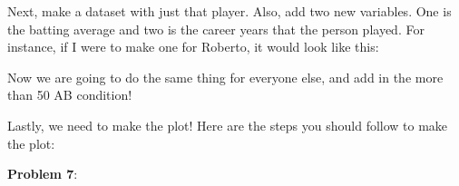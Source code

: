 \documentclass[
]{article}
\newenvironment{Shaded}{\begin{snugshade}}{\end{snugshade}}
\newcommand{\DataTypeTok}[1]{\textcolor[rgb]{0.13,0.29,0.53}{#1}}
\newcommand{\DecValTok}[1]{\textcolor[rgb]{0.00,0.00,0.81}{#1}}
\newcommand{\KeywordTok}[1]{\textcolor[rgb]{0.13,0.29,0.53}{\textbf{#1}}}
\newcommand{\NormalTok}[1]{#1}
\newcommand{\OperatorTok}[1]{\textcolor[rgb]{0.81,0.36,0.00}{\textbf{#1}}}
\newcommand{\StringTok}[1]{\textcolor[rgb]{0.31,0.60,0.02}{#1}}
\begin{document}
Next, make a dataset with just that player. Also, add two new variables.
One is the batting average and two is the career years that the person
played. For instance, if I were to make one for Roberto, it would look
like this:

\begin{Shaded}
\end{Shaded}

Now we are going to do the same thing for everyone else, and add in the
more than 50 AB condition!

\begin{Shaded}
\end{Shaded}

Lastly, we need to make the plot! Here are the steps you should follow
to make the plot:

\textbf{Problem 7}:
\end{document}

